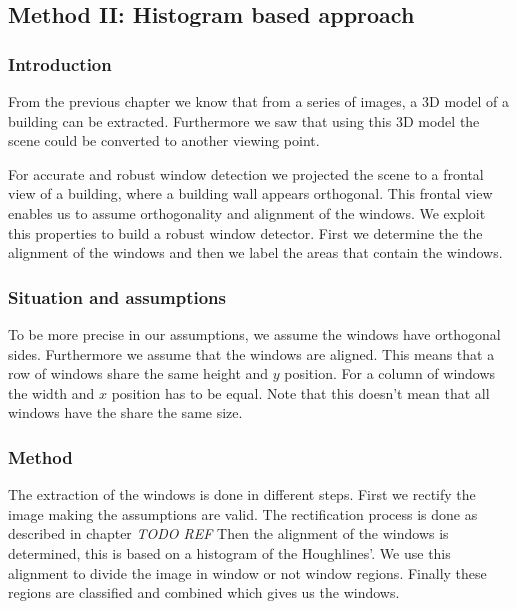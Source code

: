 \subsection{Method II: Histogram based approach} 
\subsubsection{Introduction}
From the previous chapter we know that from a series of images, a 3D model of a
building can be extracted. Furthermore we saw that using this 3D model the
scene could be converted to another viewing point. 

For accurate and robust window detection we projected the scene to a frontal
view of a building, where a building wall appears orthogonal. This frontal
view enables us to assume orthogonality and alignment of the windows. We
exploit this properties to build a robust window detector. First we determine
the the alignment of the windows and then we label the areas that contain the
windows. 

\subsubsection{Situation and assumptions}
To be more precise in our assumptions, we assume the windows have orthogonal sides.  Furthermore we
assume that the windows are aligned. This means that a row of windows share the
same height and $y$ position. For a column of windows the width and $x$
position has to be equal.  Note that this doesn't mean that all windows have the
share the same size.

\subsubsection{Method}
The extraction of the windows is done in different steps. First we rectify the 
image making the assumptions are valid. The rectification process is done as described in chapter \emph{TODO REF}
Then the alignment of the windows is determined, this is based on a histogram 
of the Houghlines'. We use this alignment to divide the
image in window or not window regions.  Finally these regions are classified
and combined which gives us the windows.


